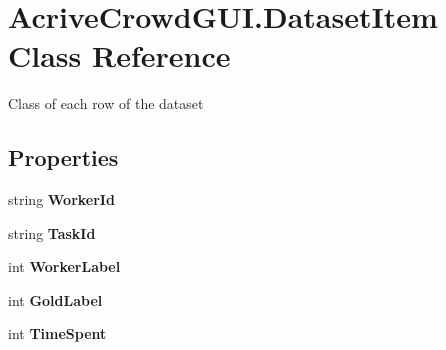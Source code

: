\hypertarget{class_acrive_crowd_g_u_i_1_1_dataset_item}{}\section{Acrive\+Crowd\+G\+U\+I.\+Dataset\+Item Class Reference}
\label{class_acrive_crowd_g_u_i_1_1_dataset_item}


Class of each row of the dataset  


\subsection*{Properties}
\begin{DoxyCompactItemize}
\item 
\hypertarget{class_acrive_crowd_g_u_i_1_1_dataset_item_ab377671db0d3bc9c017c3087f6038b50}{}string {\bfseries Worker\+Id}\label{class_acrive_crowd_g_u_i_1_1_dataset_item_ab377671db0d3bc9c017c3087f6038b50}

\item 
\hypertarget{class_acrive_crowd_g_u_i_1_1_dataset_item_aa62d92d60671b8b7608fb4cb83177e2b}{}string {\bfseries Task\+Id}\label{class_acrive_crowd_g_u_i_1_1_dataset_item_aa62d92d60671b8b7608fb4cb83177e2b}

\item 
\hypertarget{class_acrive_crowd_g_u_i_1_1_dataset_item_a888aca95a3ce372a1393f9ec216f7228}{}int {\bfseries Worker\+Label}\label{class_acrive_crowd_g_u_i_1_1_dataset_item_a888aca95a3ce372a1393f9ec216f7228}

\item 
\hypertarget{class_acrive_crowd_g_u_i_1_1_dataset_item_a583ef6afefd15549024114ad88c9b41f}{}int {\bfseries Gold\+Label}\label{class_acrive_crowd_g_u_i_1_1_dataset_item_a583ef6afefd15549024114ad88c9b41f}

\item 
\hypertarget{class_acrive_crowd_g_u_i_1_1_dataset_item_abf576b1ba18465bc38a5a34f3edf956c}{}int {\bfseries Time\+Spent}\label{class_acrive_crowd_g_u_i_1_1_dataset_item_abf576b1ba18465bc38a5a34f3edf956c}

\end{DoxyCompactItemize}


